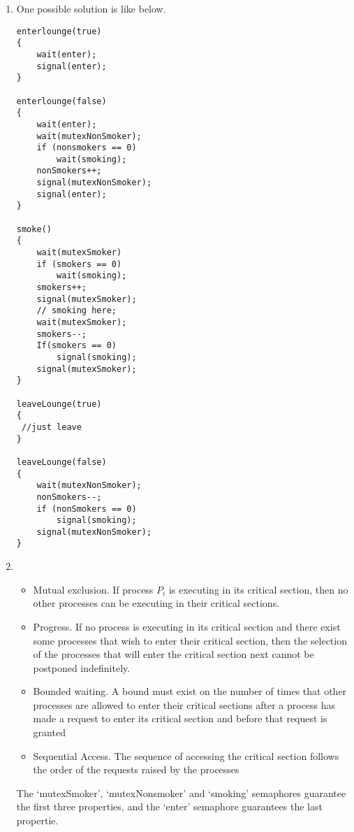 \documentclass[12pt,a4paper]{article}
\begin{document}
\begin{enumerate}
\begin{enumerate}
				\item One possible solution is like below.
				\begin{lstlisting}
enterlounge(true)
{
	wait(enter);
	signal(enter);
}

enterlounge(false)
{
	wait(enter);
	wait(mutexNonSmoker);
	if (nonsmokers == 0)
		wait(smoking);
	nonSmokers++;
	signal(mutexNonSmoker);
	signal(enter);
}

smoke()
{
	wait(mutexSmoker)
	if (smokers == 0)
		wait(smoking);
	smokers++;
	signal(mutexSmoker);
	// smoking here;
	wait(mutexSmoker);
	smokers--;
	If(smokers == 0)
		signal(smoking);
	signal(mutexSmoker);
}

leaveLounge(true)
{
 //just leave
}

leaveLounge(false)
{
	wait(mutexNonSmoker);
	nonSmokers--;
	if (nonSmokers == 0)
		signal(smoking);
	signal(mutexNonSmoker);
}
				\end{lstlisting}
				\item \begin{itemize}
					\item Mutual exclusion. If process $P_i$ is executing in its critical section, then no other processes can be executing in their critical sections.
					\item Progress. If no process is executing in its critical section and there exist some processes that wish to enter their critical section, then the selection of the processes that will enter the critical section next cannot be postponed indefinitely.
					\item Bounded waiting. A bound must exist on the number of times that other
					processes are allowed to enter their critical sections after a process has
					made a request to enter its critical section and before that request is
					granted
					\item Sequential Access. The sequence of accessing the critical section
					follows the order of the requests raised by the processes
				\end{itemize}
				The `mutexSmoker', `mutexNonsmoker' and `smoking' semaphores guarantee the first three properties, and the `enter' semaphore guarantees the last propertie.
			\end{enumerate}
	\end{enumerate}
\end{document}
